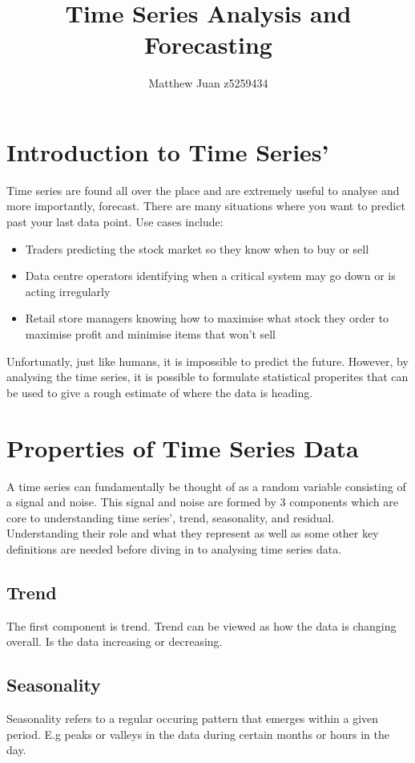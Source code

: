 \documentclass{article}
\title{Time Series Analysis and Forecasting}
\author{Matthew Juan z5259434}
\date{}
\begin{document}
  \maketitle

  \newpage
  \doublespacing
  \tableofcontents
  \singlespacing
  \newpage
  \section{Introduction to Time Series'}
  Time series are found all over the place and are extremely useful
  to analyse and more importantly, forecast. There are many situations where
  you want to predict past your last data point.
  Use cases include:
  \begin{itemize}
    \item Traders predicting the stock market so they know when to buy or sell
    \item Data centre operators identifying when a critical system may go down or is acting irregularly
    \item Retail store managers knowing how to maximise what stock they order to maximise profit and minimise items that won't sell
  \end{itemize}
  Unfortunatly, just like humans, it is impossible to predict the future.
  However, by analysing the time series, it is possible to formulate
  statistical properites that can be used to give a rough estimate of
  where the data is heading.
  \newpage
  \section{Properties of Time Series Data}
  A time series can fundamentally be thought of as a random variable consisting of a signal and noise. This signal and noise are formed by 3 components which are core to understanding time series', trend, seasonality, and residual. Understanding their role and what they represent as well as some other key definitions are needed before diving in to analysing time series data.
  
  \subsection{Trend}
  The first component is trend. Trend can be viewed as how the data is changing overall. Is the data increasing or decreasing.
  
  \subsection{Seasonality}
  Seasonality refers to a regular occuring pattern that emerges within a given period. E.g peaks or valleys in the data during certain months or hours in the day.
  
\end{document}
